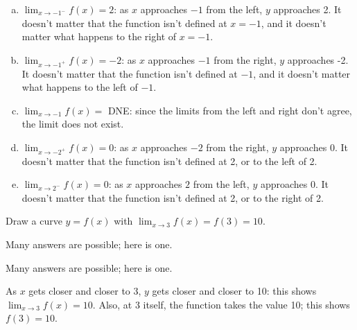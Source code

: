 \begin{solution}
\begin{enumerate}[(a)]
\item $\displaystyle \lim_{x \rightarrow -1^{-}} f(x)=2$: as $x$ approaches $-1$ from the left, $y$ approaches 2. It doesn't matter that the function isn't defined at $x=-1$, and it doesn't matter what happens to the right of $x=-1$.
\item $\displaystyle \lim_{x \rightarrow -1^{+}} f(x)=-2$: as $x$ approaches $-1$ from the right, $y$ approaches -2. It doesn't matter that the function isn't defined at $-1$, and it doesn't matter what happens to the left of $-1$.
\item $\displaystyle \lim_{x \rightarrow -1} f(x) =$ DNE: since the limits from the left and right don't agree, the limit does not exist.
\item $\displaystyle \lim_{x \rightarrow -2^{+}} f(x) =0$: as $x$ approaches $-2$ from the right, $y$ approaches 0. It doesn't matter that the function isn't defined at 2, or to the left of 2.
\item $\displaystyle \lim_{x \rightarrow 2^{-}} f(x)=0$: as $x$ approaches $2$ from the left, $y$ approaches 0. It doesn't matter that the function isn't defined at 2, or to the right of 2.
\end{enumerate}
\end{solution}


\begin{Mquestion}\label{s1.3p1}
Draw a curve $y=f(x)$ with $\displaystyle\lim_{x \rightarrow 3}f(x)=f(3)=10$.
\end{Mquestion}
\begin{answer}Many answers are possible; here is one.
\begin{center}
\end{center}
\end{answer}
\begin{solution}
Many answers are possible; here is one.
\begin{center}
\end{center}
As $x$ gets closer and closer to 3, $y$ gets closer and closer to 10: this shows $\displaystyle\lim_{x \rightarrow 3} f(x)=10$. Also, at 3 itself, the function takes the value 10; this shows $f(3)=10$.
\end{solution}

